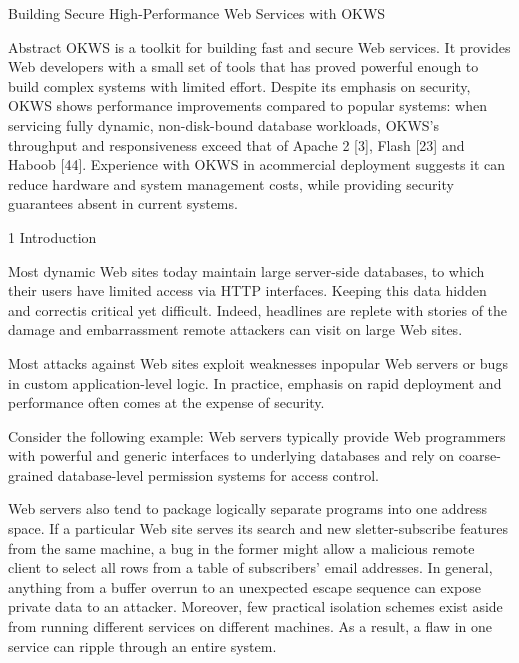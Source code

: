 Building Secure High-Performance Web Services with OKWS

Abstract
OKWS is a toolkit for building fast and secure Web services. 
It provides Web developers with a small set of tools that has proved powerful
enough to build complex systems with limited effort. 
Despite its emphasis on security, OKWS shows performance improvements compared
to popular systems: when servicing fully dynamic, non-disk-bound database
workloads, OKWS's throughput and responsiveness exceed that of Apache 2 [3],
Flash [23] and Haboob [44]. 
Experience with OKWS in acommercial deployment suggests it can reduce hardware
and system management costs, while providing security guarantees absent in
current systems.

1 Introduction

Most dynamic Web sites today maintain large server-side databases, to which
their users have limited access via HTTP interfaces.
Keeping this data hidden and correctis critical yet difficult. 
Indeed, headlines are replete with stories of the damage and embarrassment
remote attackers can visit on large Web sites.

Most attacks against Web sites exploit weaknesses inpopular Web servers or bugs
in custom application-level logic. 
In practice, emphasis on rapid deployment and performance often comes at the
expense of security.

Consider the following example: Web servers typically provide Web programmers
with powerful and generic interfaces to underlying databases and rely on
coarse-grained database-level permission systems for access control. 

Web servers also tend to package logically separate programs into one address
space.
If a particular Web site serves its search and new sletter-subscribe features
from the same machine, a bug in the former might allow a malicious remote
client to select all rows from a table of subscribers' email addresses. 
In general, anything from a buffer overrun to an unexpected escape sequence can
expose private data to an attacker. 
Moreover, few practical isolation schemes exist aside from running different
services on different machines. 
As a result, a flaw in one service can ripple through an entire system.

